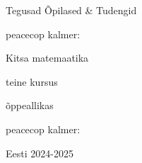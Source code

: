 \begin{titlepage}
\par{Tegusad Õpilased \& Tudengid}
\vspace{0.3\textheight}
\par{peacecop kalmer:}
\LARGE
\par{Kitsa matemaatika}
\par{teine kursus}
\normalsize
\par{õppeallikas}
\vspace{0.3\textheight}
\begin{flushright}
\par{peacecop kalmer:}
\end{flushright}
\vfill
Eesti
\hfill
2024-2025
\end{titlepage}

